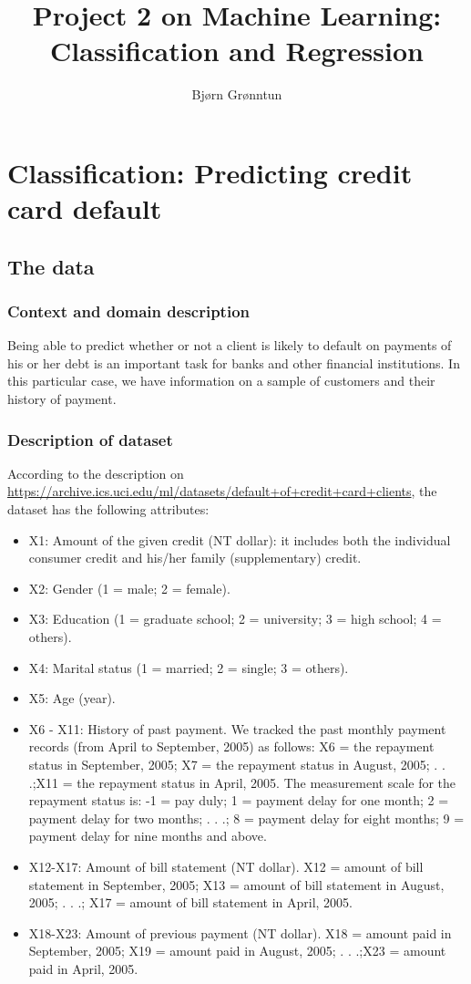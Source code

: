 \documentclass{article}
\title{Project 2 on Machine Learning: Classification and Regression}
\author{Bj{\o}rn Gr{\o}nntun}
\begin{document}
\maketitle

\begin{abstract}

\end{abstract}

\section{Classification: Predicting credit card default}
\subsection{The data}
\subsubsection{Context and domain description}
Being able to predict whether or not a client is likely to default on payments of his or her debt is an important task for banks and other financial institutions. In this particular case, we have information on a sample of customers and their history of payment.
\subsubsection{Description of dataset}
According to the description on \url{https://archive.ics.uci.edu/ml/datasets/default+of+credit+card+clients}, the dataset has the following attributes:

\begin{itemize}
    \item X1: Amount of the given credit (NT dollar): it includes both the individual consumer credit and his/her family (supplementary) credit.
    \item X2: Gender (1 = male; 2 = female).
    \item X3: Education (1 = graduate school; 2 = university; 3 = high school; 4 = others).
    \item X4: Marital status (1 = married; 2 = single; 3 = others).
    \item X5: Age (year).
    \item X6 - X11: History of past payment. We tracked the past monthly payment records (from April to September, 2005) as follows: X6 = the repayment status in September, 2005; X7 = the repayment status in August, 2005; . . .;X11 = the repayment status in April, 2005. The measurement scale for the repayment status is: -1 = pay duly; 1 = payment delay for one month; 2 = payment delay for two months; . . .; 8 = payment delay for eight months; 9 = payment delay for nine months and above.
    \item X12-X17: Amount of bill statement (NT dollar). X12 = amount of bill statement in September, 2005; X13 = amount of bill statement in August, 2005; . . .; X17 = amount of bill statement in April, 2005.
    \item X18-X23: Amount of previous payment (NT dollar). X18 = amount paid in September, 2005; X19 = amount paid in August, 2005; . . .;X23 = amount paid in April, 2005.
\end{itemize}
\end{document}
